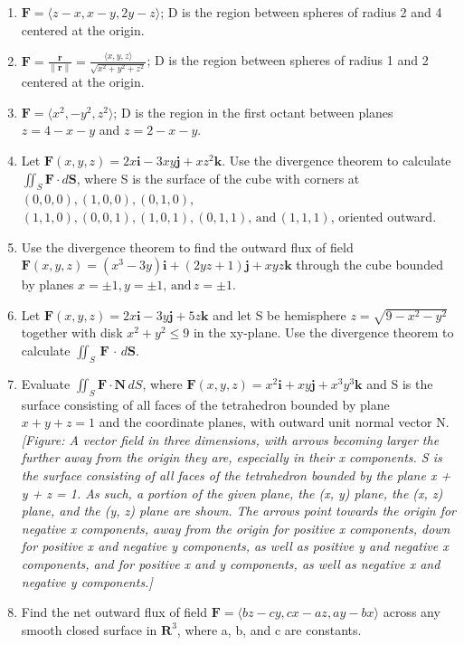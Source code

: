 \documentclass{exercises}
\begin{document}
\begin{enumerate}[resume]
\item \techrequired $\mathbf{F}=\langle z-x,x-y,2y-z\rangle$; D is the region between spheres of radius 2 and 4 centered at the origin.
\item \techrequired $\mathbf{F}=\frac{\mathbf{r}}{\|\mathbf{r}\|}=\frac{\langle x,y,z\rangle}{\sqrt{x^{2}+y^{2}+z^{2}}}$; D is the region between spheres of radius 1 and 2 centered at the origin.
\item \techrequired $\mathbf{F}=\langle x^{2},-y^{2},z^{2}\rangle$; D is the region in the first octant between planes $z=4-x-y$ and $z=2-x-y$.
\item Let $\mathbf{F}(x,y,z)=2x\mathbf{i}-3xy\mathbf{j}+xz^{2}\mathbf{k}$. Use the divergence theorem to calculate $\iint_{S}\mathbf{F}\cdot d\mathbf{S}$, where S is the surface of the cube with corners at $(0,0,0),(1,0,0),(0,1,0)$, $(1,1,0),(0,0,1),(1,0,1),(0,1,1),\,\text{and}\,(1,1,1)$, oriented outward.
\item Use the divergence theorem to find the outward flux of field $\mathbf{F}(x,y,z)=(x^{3}-3y)\mathbf{i}+(2yz+1)\mathbf{j}+xyz\mathbf{k}$ through the cube bounded by planes $x=\pm1,y=\pm1,\,\text{and}\,z=\pm1$.
\item Let $\mathbf{F}(x,y,z)=2x\mathbf{i}-3y\mathbf{j}+5z\mathbf{k}$ and let S be hemisphere $z=\sqrt{9-x^{2}-y^{2}}$ together with disk $x^{2}+y^{2}\le9$ in the xy-plane. Use the divergence theorem to calculate $\iint_{S}\,\mathbf{F}\,\cdot \,d\mathbf{S}$.
\item Evaluate $\iint_{S}\mathbf{F}\cdot \mathbf{N}\,dS$, where $\mathbf{F}(x,y,z)=x^{2}\mathbf{i}+xy\mathbf{j}+x^{3}y^{3}\mathbf{k}$ and S is the surface consisting of all faces of the tetrahedron bounded by plane $x+y+z=1$ and the coordinate planes, with outward unit normal vector N. \\ \textit{[Figure: A vector field in three dimensions, with arrows becoming larger the further away from the origin they are, especially in their x components. S is the surface consisting of all faces of the tetrahedron bounded by the plane x + y + z = 1. As such, a portion of the given plane, the (x, y) plane, the (x, z) plane, and the (y, z) plane are shown. The arrows point towards the origin for negative x components, away from the origin for positive x components, down for positive x and negative y components, as well as positive y and negative x components, and for positive x and y components, as well as negative x and negative y components.]}
\item Find the net outward flux of field $\mathbf{F}=\langle bz-cy,cx-az,ay-bx\rangle$ across any smooth closed surface in $\mathbf{R}^{3}$, where a, b, and c are constants.

\end{enumerate}
\end{document}
